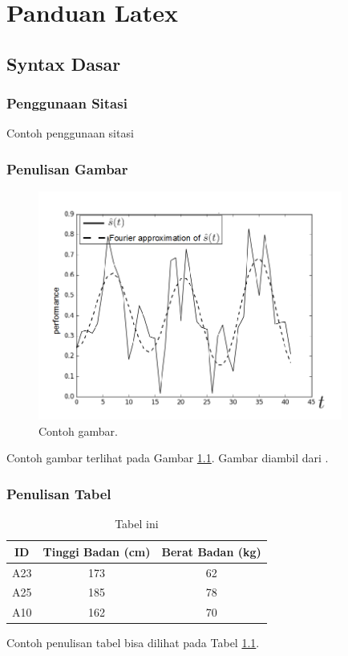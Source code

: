 \chapter{Panduan Latex}

\section{Syntax Dasar}

\subsection{Penggunaan Sitasi}
Contoh penggunaan sitasi \cite{lukito2016,santosa2011user}
\cite{setiawan2014fuzzy} \cite{wibowo2014line} \cite{marenda2016digitory} \cite{wibirama2013dual,wibowo2016clustering}

\subsection{Penulisan Gambar}

\begin{figure}[h]
	\centering
	\includegraphics[width=10cm]{contents/chapter-1/sample-fig.png}
	\caption{Contoh gambar.}
	\label{Fig: Contoh gambar}
\end{figure}

Contoh gambar terlihat pada Gambar \ref{Fig: Contoh gambar}. Gambar diambil dari \cite{wibowo2016clustering}.

\subsection{Penulisan Tabel}
\begin{table}[h]
	\caption{Tabel ini}
	\vspace{0.5em}
	\centering
	\begin{tabular}{|c|c|c|}
		\hline
		ID & Tinggi Badan (cm) & Berat Badan (kg) \\
		\hline \hline
		A23 & 173 & 62 \\
		A25 & 185 & 78 \\
		A10 & 162 & 70 \\ \hline
	\end{tabular}
	\label{Tab: Tabel Tinggi Berat}
\end{table}
Contoh penulisan tabel bisa dilihat pada Tabel \ref{Tab: Tabel Tinggi Berat}.

